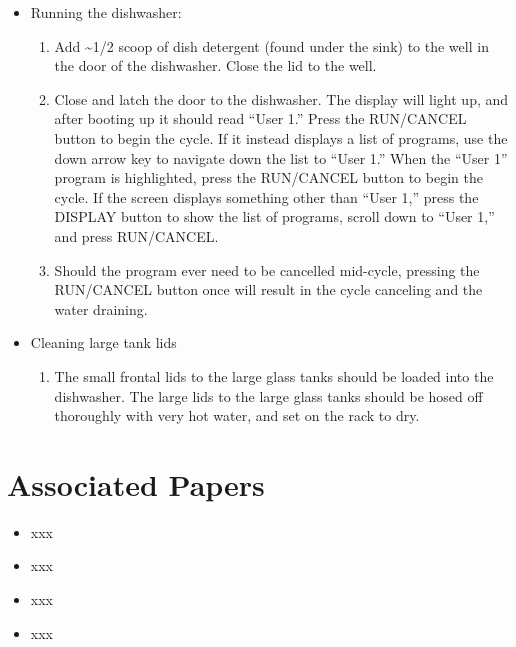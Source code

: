 \documentclass[
  letterpaper,
  DIV=11,
  numbers=noendperiod]{scrreprt}
\providecommand{\tightlist}{%
  \setlength{\itemsep}{0pt}\setlength{\parskip}{0pt}}\usepackage{longtable,booktabs,array}
\begin{document}
\begin{itemize}
\tightlist
\item
  Running the dishwasher:

  \begin{enumerate}
  \def\labelenumi{\arabic{enumi}.}
  \tightlist
  \item
    Add \textasciitilde1/2 scoop of dish detergent (found under the
    sink) to the well in the door of the dishwasher. Close the lid to
    the well.
  \item
    Close and latch the door to the dishwasher. The display will light
    up, and after booting up it should read ``User 1.'' Press the
    RUN/CANCEL button to begin the cycle. If it instead displays a list
    of programs, use the down arrow key to navigate down the list to
    ``User 1.'' When the ``User 1'' program is highlighted, press the
    RUN/CANCEL button to begin the cycle. If the screen displays
    something other than ``User 1,'' press the DISPLAY button to show
    the list of programs, scroll down to ``User 1,'' and press
    RUN/CANCEL.
  \item
    Should the program ever need to be cancelled mid-cycle, pressing the
    RUN/CANCEL button once will result in the cycle canceling and the
    water draining.
  \end{enumerate}
\item
  Cleaning large tank lids

  \begin{enumerate}
  \def\labelenumi{\arabic{enumi}.}
  \tightlist
  \item
    The small frontal lids to the large glass tanks should be loaded
    into the dishwasher. The large lids to the large glass tanks should
    be hosed off thoroughly with very hot water, and set on the rack to
    dry.
  \end{enumerate}
\end{itemize}

\hypertarget{associated-papers-13}{%
\section{Associated Papers}\label{associated-papers-13}}

\begin{itemize}
\tightlist
\item
  xxx
\item
  xxx
\item
  xxx
\item
  xxx
\end{itemize}
\end{document}
